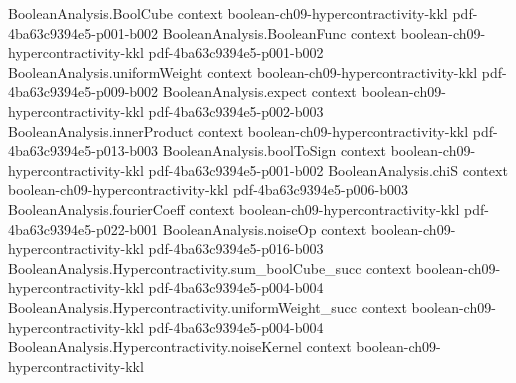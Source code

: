 \begin{lemma}
\leanok
{}
\label{BooleanAnalysis.Hypercontractivity.two_func_hyp_succ}
\proofstep
  {BooleanAnalysis.BoolCube}
  {context}
  {boolean-ch09-hypercontractivity-kkl}
  {pdf-4ba63c9394e5-p001-b002}
\proofstep
  {BooleanAnalysis.BooleanFunc}
  {context}
  {boolean-ch09-hypercontractivity-kkl}
  {pdf-4ba63c9394e5-p001-b002}
\proofstep
  {BooleanAnalysis.uniformWeight}
  {context}
  {boolean-ch09-hypercontractivity-kkl}
  {pdf-4ba63c9394e5-p009-b002}
\proofstep
  {BooleanAnalysis.expect}
  {context}
  {boolean-ch09-hypercontractivity-kkl}
  {pdf-4ba63c9394e5-p002-b003}
\proofstep
  {BooleanAnalysis.innerProduct}
  {context}
  {boolean-ch09-hypercontractivity-kkl}
  {pdf-4ba63c9394e5-p013-b003}
\proofstep
  {BooleanAnalysis.boolToSign}
  {context}
  {boolean-ch09-hypercontractivity-kkl}
  {pdf-4ba63c9394e5-p001-b002}
\proofstep
  {BooleanAnalysis.chiS}
  {context}
  {boolean-ch09-hypercontractivity-kkl}
  {pdf-4ba63c9394e5-p006-b003}
\proofstep
  {BooleanAnalysis.fourierCoeff}
  {context}
  {boolean-ch09-hypercontractivity-kkl}
  {pdf-4ba63c9394e5-p022-b001}
\proofstep
  {BooleanAnalysis.noiseOp}
  {context}
  {boolean-ch09-hypercontractivity-kkl}
  {pdf-4ba63c9394e5-p016-b003}
\proofstep
  {BooleanAnalysis.Hypercontractivity.sum_boolCube_succ}
  {context}
  {boolean-ch09-hypercontractivity-kkl}
  {pdf-4ba63c9394e5-p004-b004}
\proofstep
  {BooleanAnalysis.Hypercontractivity.uniformWeight_succ}
  {context}
  {boolean-ch09-hypercontractivity-kkl}
  {pdf-4ba63c9394e5-p004-b004}
\proofstep
  {BooleanAnalysis.Hypercontractivity.noiseKernel}
  {context}
  {boolean-ch09-hypercontractivity-kkl}

\end{lemma}
